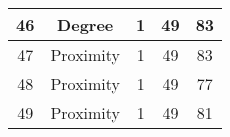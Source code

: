 \documentclass[results.tex]{subfiles}
\begin{document}
\begin{center}
\begin{tabular}{| c || c | c | c | c |}
            \hline
            46                      & Degree                       & 1                      & 49                      & 83                   \\
            \hline
            47                      & Proximity                    & 1                      & 49                      & 83                   \\
            \hline
            48                      & Proximity                    & 1                      & 49                      & 77                   \\
            \hline
            49                      & Proximity                    & 1                      & 49                      & 81                   \\
            \hline
        \end{tabular}
    \end{center}
\end{document}

